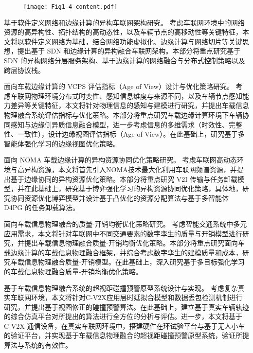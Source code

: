 \begin{figure}[h] 
	\centering
	\texttt{[image: Fig1-4-content.pdf]}
	\label{fig 1-4}
\end{figure}

 基于软件定义网络和边缘计算的异构车联网架构研究。
考虑车联网环境中的网络资源的高异构性、拓扑结构的高动态性，以及车辆节点的高移动性等关键特征，本文将以软件定义网络为基础，结合网络功能虚拟化、边缘计算与网络切片等关键思想，提出基于 SDN 和边缘计算的异构融合车联网架构。本部分将重点研究基于 SDN 的异构网络分层服务架构、基于边缘计算的网络融合与分布式控制策略以及跨层协议栈。

 面向车载边缘计算的 VCPS 评估指标（Age of View）设计与优化策略研究。
考虑车联网物理环境分布式时变性、感知信息维度与来源不同，以及车辆节点感知能力差异等关键特征，本文将针对物理信息的感知与建模进行研究，并提出车载信息物理融合系统评估指标与优化策略。本部分将重点研究车载边缘计算环境下车辆协同感知与边缘侧异质信息融合模型，进一步考虑信息的多维需求（时效性、完整性、一致性），设计边缘视图评估指标（Age of View）。在此基础上，研究基于多智能体强化学习的边缘视图优化策略。

 面向 NOMA 车载边缘计算的异构资源协同优化策略研究。
考虑车联网高动态环境与高异构资源，本文将首先引入NOMA技术最大化利用车联网频谱资源，并提出基于边缘协同的异构资源优化策略。本部分将重点研究 V2I 传输与任务卸载模型，并在此基础上，研究基于博弈强化学习的异构资源协同优化策略，具体地，研究协同资源优化博弈模型并设计基于凸优化的资源分配算法与基于多智能体 D4PG 的任务卸载算法。

 面向车载信息物理融合的质量-开销均衡优化策略研究。
考虑智能交通系统中多元应用需求，本文将针对车联网中不同交通要素的数字孪生的质量与开销模型进行研究，并提出车载信息物理融合质量-开销均衡优化策略。本部分将重点研究面向车载边缘计算的车载信息物理融合框架，并综合考虑数字孪生的建模质量和成本，研究车载信息物理融合质量-开销模型。在此基础上，深入研究基于多目标强化学习的车载信息物理融合质量-开销均衡优化策略。

 基于车载信息物理融合系统的超视距碰撞预警原型系统设计与实现。
考虑复杂真实车联网环境，本文将针对C-V2X应用层时延拟合模型和数据丢包检测机制进行研究，并提出基于视图修正的碰撞预警算法。在此基础上，建立基于真实车辆轨迹的综合仿真平台对所提出的算法进行全方位的分析与评估。进一步，本文将基于 C-V2X 通信设备，在真实车联网环境中，搭建硬件在环试验平台与基于无人小车的验证平台，并实现基于车载信息物理融合的超视距碰撞预警原型系统，验证所提算法与系统的有效性。

